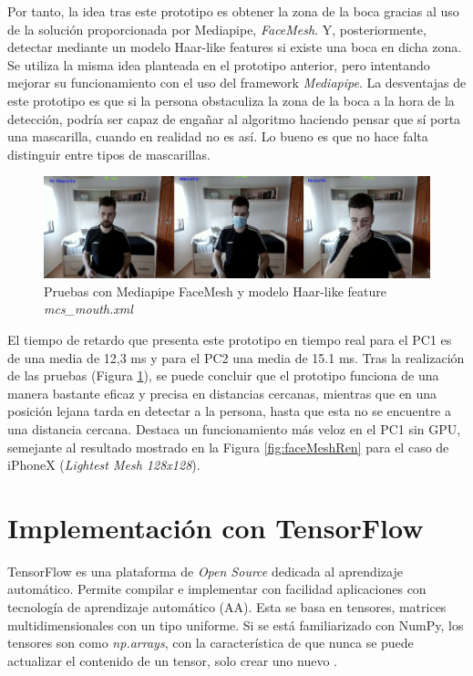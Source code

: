 Por tanto, la idea tras este prototipo es obtener la zona de la boca gracias al uso de la solución proporcionada por Mediapipe, \textit{FaceMesh}. Y, posteriormente, detectar mediante un modelo Haar-like features si existe una boca en dicha zona. Se utiliza la misma idea planteada en el prototipo anterior, pero intentando mejorar su funcionamiento con el uso del framework \textit{Mediapipe}. La desventajas de este prototipo es que si la persona obstaculiza la zona de la boca a la hora de la detección, podría ser capaz de engañar al algoritmo haciendo pensar que sí porta una mascarilla, cuando en realidad no es así. Lo bueno es que no hace falta distinguir entre tipos de mascarillas.

\begin{figure}[htp]
	\centering
	\includegraphics[width=17cm]{imagenes/mediapipe_prueba.png}
	\caption{Pruebas con Mediapipe FaceMesh y modelo Haar-like feature \textit{mcs\_mouth.xml}}
	\label{fig:protoMediapipe}
\end{figure}

El tiempo de retardo que presenta este prototipo en tiempo real para el PC1 es de una media de 12,3 ms y para el PC2 una media de 15.1 ms. Tras la realización de las pruebas (Figura \ref{fig:protoMediapipe}), se puede concluir que el prototipo funciona de una manera bastante eficaz y precisa en distancias cercanas, mientras que en una posición lejana tarda en detectar a la persona, hasta que esta no se encuentre a una distancia cercana. Destaca un funcionamiento más veloz en el PC1 sin GPU, semejante al resultado mostrado en la Figura \ref{fig:faceMeshRen} para el caso de iPhoneX (\textit{Lightest Mesh 128x128}).

\newpage
\section{Implementación con TensorFlow}
\vspace{-1cm}
TensorFlow es una plataforma de \textit{Open Source} dedicada al aprendizaje automático. Permite compilar e implementar con facilidad aplicaciones con tecnología de aprendizaje automático (AA). Esta se basa en tensores, matrices multidimensionales con un tipo uniforme. Si se está familiarizado con NumPy, los tensores son como \textit{np.arrays}, con la característica de que nunca se puede actualizar el contenido de un tensor, solo crear uno nuevo \cite{tensorflow}.

